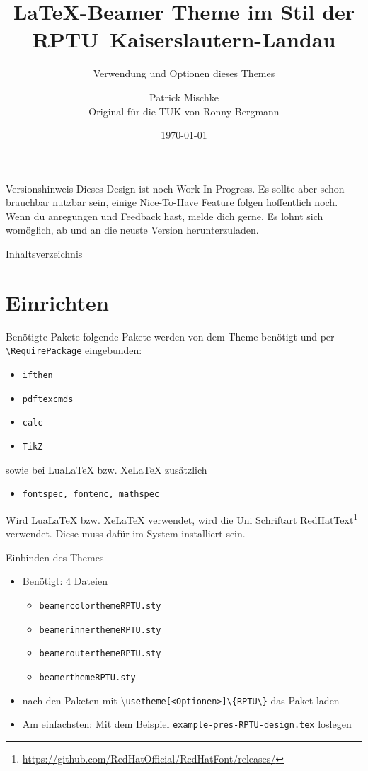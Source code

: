 \documentclass[german,10pt,xcolor=colortbl,compress
]{beamer}
\title{\LaTeX-Beamer Theme im Stil der \mbox{RPTU Kaiserslautern-Landau}}
\subtitle{Verwendung und Optionen dieses Themes}
\date[]{\today}
\author[P. Mischke]{Patrick Mischke\\Original für die TUK von Ronny Bergmann}
\institute[]{AG Ott\\FB Physik\\RPTU Kaiserslautern}
\begin{document}
\begin{frame}{Versionshinweis}
	Dieses Design ist noch Work-In-Progress. Es sollte aber schon brauchbar nutzbar sein, einige Nice-To-Have Feature folgen hoffentlich noch. \\
	Wenn du anregungen und Feedback hast, melde dich gerne. Es lohnt sich womöglich, ab und an die neuste Version herunterzuladen.
\end{frame}
\maketitle
\begin{frame}{Inhaltsverzeichnis}
	\tableofcontents
\end{frame}
\section{Einrichten}
\begin{frame}[fragile]{Benötigte Pakete}
	folgende Pakete werden von dem Theme benötigt und per \lstinline!\RequirePackage! eingebunden:
	\begin{itemize}
		\item \lstinline!ifthen!
		\item \lstinline!pdftexcmds!
		\item \lstinline!calc!
		\item \lstinline!TikZ!
	\end{itemize}\vspace{\baselineskip}
	sowie bei LuaLaTeX bzw. XeLaTeX zusätzlich
	\begin{itemize}
		\item \lstinline!fontspec, fontenc, mathspec!
	\end{itemize}\vspace{\baselineskip}
	Wird LuaLaTeX bzw. XeLaTeX verwendet, wird die Uni Schriftart RedHatText\footnote{\url{https://github.com/RedHatOfficial/RedHatFont/releases/}} verwendet.
	Diese muss dafür im System installiert sein.
\end{frame}
\begin{frame}{Einbinden des Themes}
	\begin{itemize}
		\item Benötigt: 4 Dateien
		      \begin{itemize}
			      \item \lstinline|beamercolorthemeRPTU.sty|
			      \item \lstinline|beamerinnerthemeRPTU.sty|
			      \item \lstinline!beamerouterthemeRPTU.sty!
			      \item \lstinline|beamerthemeRPTU.sty|
		      \end{itemize}

		\item nach den Paketen mit \textbackslash\lstinline|usetheme[<Optionen>]\{RPTU\}| das Paket laden
		\item Am einfachsten: Mit dem Beispiel \lstinline!example-pres-RPTU-design.tex! loslegen
	\end{itemize}
\end{frame}
\end{document}
